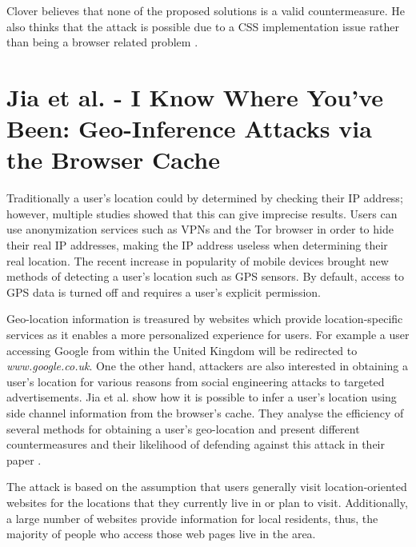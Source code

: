 \documentclass[10pt,a4paper,twoside]{book}
\begin{document}
Clover believes that none of the proposed solutions is a valid countermeasure. He also thinks that the attack is possible due to a CSS implementation issue rather than being a browser related problem \cite{cssvisited}.


\section{Jia et al. - I Know Where You've Been: Geo-Inference Attacks via the Browser Cache}

Traditionally a user's location could by determined by checking their IP address; however, multiple studies showed that this can give imprecise results. Users can use anonymization services such as VPNs and the Tor browser in order to hide their real IP addresses, making the IP address useless when determining their real location. The recent increase in popularity of mobile devices brought new methods of detecting a user's location such as GPS sensors. By default, access to GPS data is turned off and requires a user's explicit permission. 

Geo-location information is treasured by websites which provide location-specific services as it enables a more personalized experience for users. For example a user accessing Google from within the United Kingdom will be redirected to \textit{www.google.co.uk}. One the other hand, attackers are also interested in obtaining a user's location for various reasons from social engineering attacks to targeted advertisements. Jia et al. show how it is possible to infer a user's location using side channel information from the browser's cache. They analyse the efficiency of several methods for obtaining a user's geo-location and present different countermeasures and their likelihood of defending against this attack in their paper \cite{jia2015know}.

The attack is based on the assumption that users generally visit location-oriented websites for the locations that they currently live in or plan to visit. Additionally, a large number of websites provide information for local residents, thus, the majority of people who access those web pages live in the area. 
\end{document}
